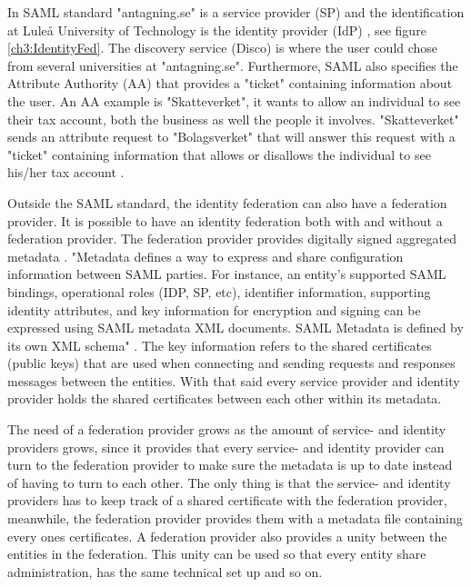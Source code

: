 In SAML standard "antagning.se" is a service provider (SP) \cite[p.~11]{pdf:oasis-open-glossary} and the identification at 
Lule\r{a} University of Technology is the identity provider (IdP) \cite[p.~7]{pdf:oasis-open-glossary}, see figure \ref{ch3:IdentityFed}.
The discovery service (Disco) is where the user could chose from several universities at "antagning.se".
Furthermore, SAML also specifies the Attribute Authority (AA) that provides 
a "ticket" containing information about the user. An AA example is "Skatteverket", it wants to 
allow an individual to see their tax account, both the business as well the people it involves. 
"Skatteverket" sends an attribute request to "Bolagsverket" that will answer this request 
with a "ticket" containing information that allows or disallows the individual to see his/her tax account \cite[p.~284]{pdf:SOU}.

Outside the SAML standard, the identity federation can also have a federation provider. It is possible to have an identity federation both 
with and without a federation provider. 
The federation provider provides digitally signed aggregated metadata \cite[p.~3]{pdf:Skolfederation}. 
"Metadata defines a way to express and share configuration information between SAML parties.
For instance, an entity's supported SAML bindings, operational roles (IDP, SP, etc), identifier information,
supporting identity attributes, and key information for encryption and signing can be expressed using SAML
metadata XML documents. SAML Metadata is defined by its own XML schema" \cite[p.~16]{pdf:oasis-open}.
The key information refers to the shared certificates (public keys) that are used when connecting and sending requests and responses 
messages between the entities.
With that said every service provider and identity provider holds the shared certificates between each other within its metadata. 

The need of a federation provider grows as the amount of service- and identity providers grows,
since it provides that every service- and identity provider can turn to the federation provider to make sure the metadata is up to date 
instead of having to turn to each other. 
The only thing is that the service- and identity providers has to keep track of a shared certificate with the federation provider, 
meanwhile, the federation provider provides them with a metadata file containing every ones certificates.
A federation provider also provides a unity between the entities in the federation. This unity can be used so that every entity share 
administration, has the same technical set up and so on.

